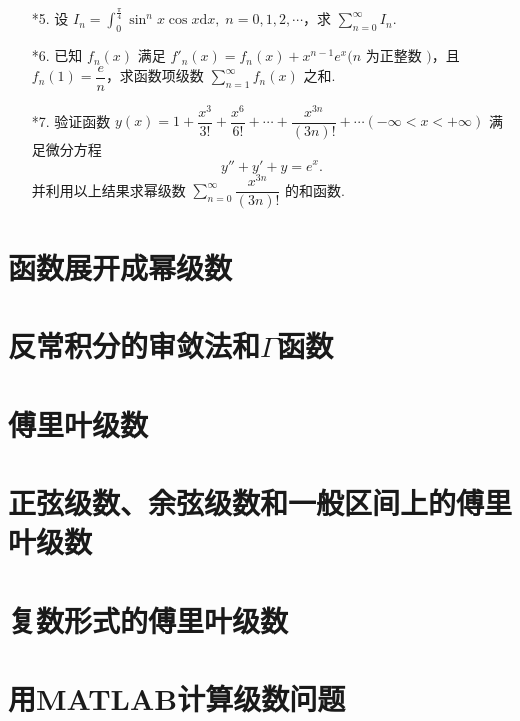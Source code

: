 \begin{enumerate}
    \item[*5.] 设 $\displaystyle I_n=\int_0^{\frac{\pi}{4}}\sin^nx\cos x\text{d}x,\;n=0, 1, 2, \cdots$，求 $\displaystyle \sum_{n=0}^{\infty}I_n$.
    
    \item[*6.] 已知 $f_n(x)$ 满足 $f'_n(x)=f_n(x)+x^{n-1}e^x(n$ 为正整数 $)$，且 $f_n(1)=\dfrac{e}{n}$，求函数项级数 $\displaystyle \sum_{n=1}^{\infty}f_n(x)$ 之和.
    
    \item[*7.] 验证函数 $y(x)=1+\dfrac{x^3}{3!}+\dfrac{x^6}{6!}+\cdots+\dfrac{x^{3n}}{(3n)!}+\cdots(-\infty<x<+\infty)$ 满足微分方程
    \[
        y''+y'+y=e^x.
    \]
    并利用以上结果求幂级数 $\displaystyle \sum_{n=0}^{\infty}\dfrac{x^{3n}}{(3n)!}$ 的和函数. 
\end{enumerate}

\section{函数展开成幂级数}



\section{反常积分的审敛法和$\Gamma$函数}

\section{傅里叶级数}

\section{正弦级数、余弦级数和一般区间上的傅里叶级数}

\section{复数形式的傅里叶级数}

\section{用MATLAB计算级数问题}



